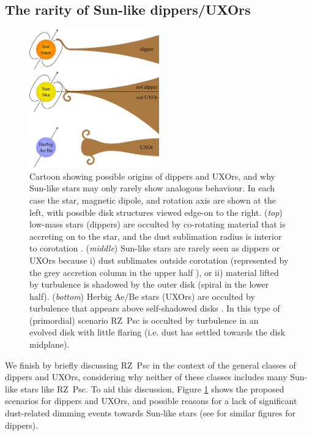 \documentclass[]{rsos}
\begin{document}
\subsection{The rarity of Sun-like dippers/UXOrs}\label{ss:rarity}

\begin{figure}
  \begin{center}
    \hspace{-0.5cm} \includegraphics[width=0.5\textwidth]{figs/cartoon-crop.ps}
    \caption{Cartoon showing possible origins of dippers and UXOrs, and why Sun-like
      stars may only rarely show analogous behaviour. In each case the star, magnetic
      dipole, and rotation axis are shown at the left, with possible disk structures
      viewed edge-on to the right. (\emph{top}) low-mass stars (dippers) are occulted by
      co-rotating material that is accreting on to the star, and the dust sublimation
      radius is interior to corotation \cite{2016arXiv160503985B}. (\emph{middle})
      Sun-like stars are rarely seen as dippers or UXOrs because i) dust sublimates
      outside corotation (represented by the grey accretion column in the upper half
      \cite{2016arXiv160503985B}), or ii) material lifted by turbulence is shadowed by
      the outer disk (spiral in the lower half). (\emph{bottom}) Herbig Ae/Be stars
      (UXOrs) are occulted by turbulence that appears above self-shadowed disks
      \cite{2003ApJ...594L..47D}. In this type of (primordial) scenario RZ~Psc is
      occulted by turbulence in an evolved disk with little flaring (i.e. dust has
      settled towards the disk midplane).}\label{fig:cartoon}
  \end{center}
\end{figure}

We finish by briefly discussing RZ~Psc in the context of the general classes of dippers
and UXOrs, considering why neither of these classes includes many Sun-like stars like
RZ~Psc. To aid this discussion, Figure \ref{fig:cartoon} shows the proposed scenarios for
dippers and UXOrs, and possible reasons for a lack of significant dust-related dimming
events towards Sun-like stars (see \cite{2016arXiv160503985B} for similar figures for
dippers).
\end{document}
